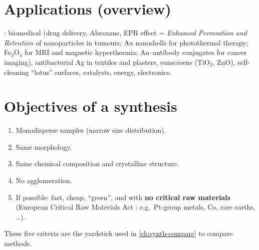 \section{Applications (overview)}
: biomedical (drug delivery, Abraxane, EPR effect = \emph{Enhanced Permeation and Retention} of
nanoparticles in tumours; Au nanoshells for photothermal therapy; Fe$_3$O$_4$ for MRI and magnetic hyperthermia;
Au--antibody conjugates for cancer imaging), antibacterial Ag in textiles and plasters, sunscreens (TiO$_2$, ZnO),
self-cleaning ``lotus'' surfaces, catalysts, energy, electronics.

\section{Objectives of a synthesis}
\label{sec:objectives}
\begin{keybox}
\begin{enumerate}
  \item Monodisperse samples (narrow size distribution).
  \item Same morphology.
  \item Same chemical composition and crystalline structure.
  \item No agglomeration.
  \item If possible: fast, cheap, ``green'', and with \textbf{no critical raw materials}
        (European Critical Raw Materials Act : e.g.\ Pt-group metals, Co, rare earths, \ldots).
\end{enumerate}
\end{keybox}
These five criteria are the yardstick used in \cref{ch:synth-compare} to compare methods.
